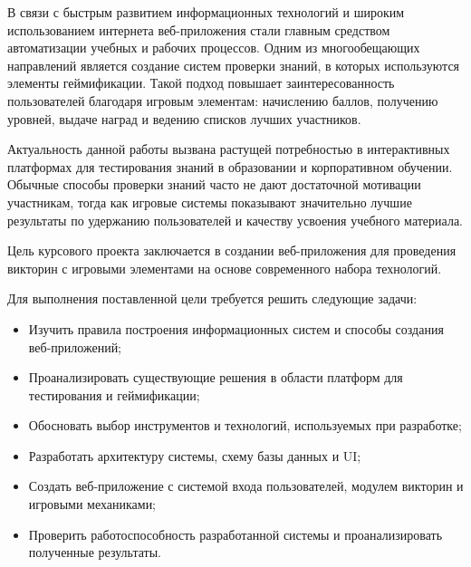 \documentclass[14pt,a4paper]{extreport}
\begin{document}
\begin{singlespacing}
\newpage

\renewcommand{\contentsname}{\hfill Содержание\hfill}

\tableofcontents
\end{singlespacing}
\newpage

\intro

В связи с быстрым развитием информационных технологий и широким использованием интернета веб-приложения стали главным средством автоматизации учебных и рабочих процессов. Одним из многообещающих направлений является создание систем проверки знаний, в которых используются элементы геймификации. Такой подход повышает заинтересованность пользователей благодаря игровым элементам: начислению баллов, получению уровней, выдаче наград и ведению списков лучших участников.

Актуальность данной работы вызвана растущей потребностью в интерактивных платформах для тестирования знаний в образовании и корпоративном обучении. Обычные способы проверки знаний часто не дают достаточной мотивации участникам, тогда как игровые системы показывают значительно лучшие результаты по удержанию пользователей и качеству усвоения учебного материала.

Цель курсового проекта заключается в создании веб-приложения для проведения викторин с игровыми элементами на основе современного набора технологий.

Для выполнения поставленной цели требуется решить следующие задачи:

\begin{itemize}
    \item Изучить правила построения информационных систем и способы создания веб-приложений;
    \item Проанализировать существующие решения в области платформ для тестирования и геймификации;
    \item Обосновать выбор инструментов и технологий, используемых при разработке;
    \item Разработать архитектуру системы, схему базы данных и UI;
    \item Создать веб-приложение с системой входа пользователей, модулем викторин и игровыми механиками;
    \item Проверить работоспособность разработанной системы и проанализировать полученные результаты.
\end{itemize}
\end{document}
